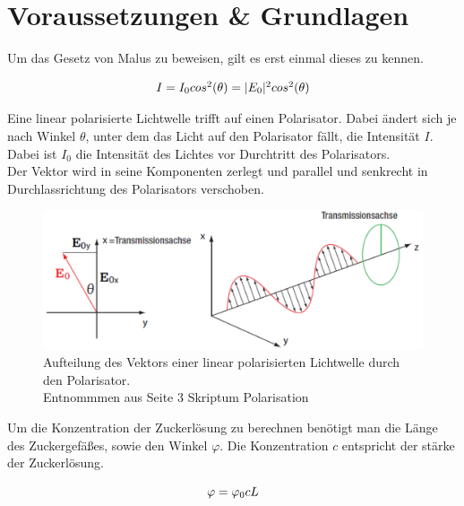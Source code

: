 \documentclass[12pt,a4paper,twoside]{article}
\begin{document}
\section{Voraussetzungen \& Grundlagen} %
Um das Gesetz von Malus zu beweisen, gilt es erst einmal dieses zu kennen. 


    \begin{equation}
        \label{eq:Gesetz von Malus}
        \centerline{$I = I_0 cos^2(\theta) = \vert E_0 \vert ^2 cos^2(\theta)$}
    \end{equation}

\noindent
Eine linear polarisierte Lichtwelle trifft auf einen Polarisator. Dabei ändert sich je nach Winkel $\theta$, unter dem das Licht auf den Polarisator fällt, die Intensität $I$. 
Dabei ist $I_0$ die Intensität des Lichtes vor Durchtritt des Polarisators. 
\\
Der Vektor wird in seine Komponenten zerlegt und parallel und senkrecht in Durchlassrichtung des Polarisators verschoben. 

\begin{figure}[H]
    \centering
    \includegraphics[width=0.6\linewidth]{nudes/Mallus.png}
    \caption{Aufteilung des Vektors einer linear polarisierten Lichtwelle durch den Polarisator. \\ Entnommmen aus Seite 3 Skriptum Polarisation \cite{teachcenter2}}
    \label{fig:Mallus Vektor}
\end{figure}

\noindent
Um die Konzentration der Zuckerlösung zu berechnen benötigt man die Länge des Zuckergefäßes, sowie den Winkel $\varphi$. Die Konzentration $c$ entspricht der stärke der Zuckerlösung. 

\begin{equation}
    \label{eq:Konzentration Zucker}
    \centerline{$\varphi = \varphi_0 cL$}
\end{equation}
\end{document}
